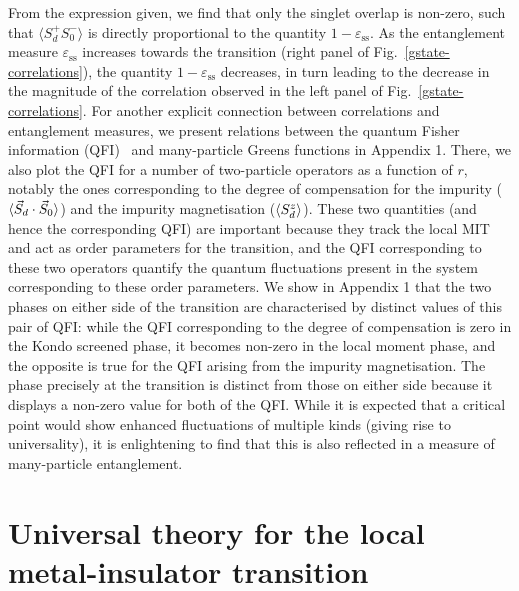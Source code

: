 From the expression given, we find that only the singlet overlap is non-zero, such that $\langle S_{d}^{+}S_{0}^{-}\rangle$ is directly proportional to the quantity \(1-\varepsilon_\text{ss}\). As the entanglement measure \(\varepsilon_\text{ss}\) increases towards the transition (right panel of Fig.~\eqref{gstate-correlations}), the quantity \(1 - \varepsilon_\text{ss}\) decreases, in turn leading to the decrease in the magnitude of the correlation observed in the left panel of Fig.~\eqref{gstate-correlations}. For another explicit connection between correlations and entanglement measures, we present relations between the quantum Fisher information (QFI)~\cite{Hauke2016} and many-particle Greens functions in Appendix 1. There, we also plot the QFI for a number of two-particle operators as a function of \(r\), notably the ones corresponding to the degree of compensation for the impurity (\(\braket{\vec{S}_d\cdot\vec{S}_0}\)) and the impurity magnetisation (\(\braket{S_d^z}\)).
These two quantities (and hence the corresponding QFI) are important because they track the local MIT and act as order parameters for the transition, and the QFI corresponding to these two operators quantify the quantum fluctuations present in the system corresponding to these order parameters.
We show in Appendix 1 that the two phases on either side of the transition are characterised by distinct values of this pair of QFI: while the QFI corresponding to the degree of compensation is zero in the Kondo screened phase, it becomes non-zero in the local moment phase, and the opposite is true for the QFI arising from the impurity magnetisation.
The phase precisely at the transition is distinct from those on either side because it displays a non-zero value for both of the QFI.
While it is expected that a critical point would show enhanced fluctuations of multiple kinds (giving rise to universality), it is enlightening to find that this is also reflected in a measure of many-particle entanglement.

\section{Universal theory for the local metal-insulator transition}\label{insights}

